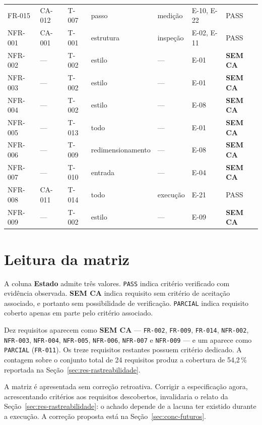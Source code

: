 {\begin{longtable}{@{}p{1.5cm} p{1.4cm} p{1.4cm} p{1.7cm} p{1.7cm} p{1.7cm} p{1.4cm}@{}}
		\addlinespace
		FR-015   & CA-012 & T-007 & passo & medição & E-10, E-22 & PASS \\
		\addlinespace
		NFR-001  & CA-001 & T-001 & estrutura & inspeção & E-02, E-11 & PASS \\
		\addlinespace
		NFR-002  & --- & T-002 & estilo & --- & E-01 & \textbf{SEM CA} \\
		\addlinespace
		NFR-003  & --- & T-002 & estilo & --- & E-01 & \textbf{SEM CA} \\
		\addlinespace
		NFR-004  & --- & T-002 & estilo & --- & E-08 & \textbf{SEM CA} \\
		\addlinespace
		NFR-005  & --- & T-013 & todo & --- & E-01 & \textbf{SEM CA} \\
		\addlinespace
		NFR-006  & --- & T-009 & redimensionamento & --- & E-08 & \textbf{SEM CA} \\
		\addlinespace
		NFR-007  & --- & T-010 & entrada & --- & E-04 & \textbf{SEM CA} \\
		\addlinespace
		NFR-008  & CA-011 & T-014 & todo & execução & E-21 & PASS \\
		\addlinespace
		NFR-009  & --- & T-002 & estilo & --- & E-09 & \textbf{SEM CA} \\
	\end{longtable}
}

\section{Leitura da matriz}
\label{ap:leitura}

A coluna \textbf{Estado} admite três valores. \texttt{PASS} indica critério
verificado com evidência observada. \textbf{SEM CA} indica requisito sem critério
de aceitação associado, e portanto sem possibilidade de verificação.
\texttt{PARCIAL} indica requisito coberto apenas em parte pelo critério
associado.

Dez requisitos aparecem como \textbf{SEM CA} --- \texttt{FR-002}, \texttt{FR-009},
\texttt{FR-014}, \texttt{NFR-002}, \texttt{NFR-003}, \texttt{NFR-004},
\texttt{NFR-005}, \texttt{NFR-006}, \texttt{NFR-007} e \texttt{NFR-009} --- e um
aparece como \texttt{PARCIAL} (\texttt{FR-011}). Os treze requisitos restantes
possuem critério dedicado. A contagem sobre o conjunto total de 24 requisitos
produz a cobertura de 54,2\,\% reportada na
Seção~\ref{sec:res-rastreabilidade}.

A matriz é apresentada sem correção retroativa. Corrigir a especificação agora,
acrescentando critérios aos requisitos descobertos, invalidaria o relato da
Seção~\ref{sec:res-rastreabilidade}: o achado depende de a lacuna ter existido
durante a execução. A correção proposta está na Seção~\ref{sec:conc-futuros}.
